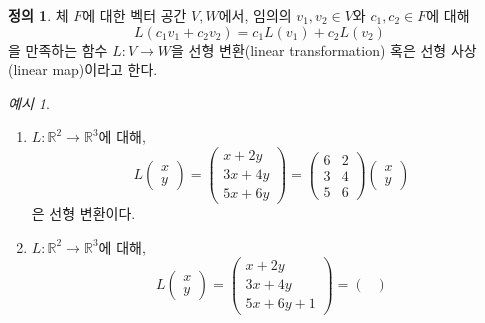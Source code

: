 \documentclass[unfonts,oneside,a4paper]{oblivoir}
\theoremstyle{definition}
\newtheorem{definition}{정의}
\theoremstyle{theorem}
\theoremstyle{remark}
\theoremstyle{remark}
\theoremstyle{remark}
\newtheorem*{example}{예시}
\theoremstyle{remark}
\renewcommand{\vec}[1]{\bm{\mathit{#1}}}
\begin{document}
\begin{definition}
    체 $F$에 대한 벡터 공간 $V, W$에서, 임의의 $\vec v_1, \vec v_2 \in V$와 $c_1, c_2 \in F$에 대해
    \begin{equation*}
        L(c_1 \vec v_1 + c_2 \vec v_2) = c_1 L(\vec v_1) + c_2 L(\vec v_2)
    \end{equation*}
    을 만족하는 함수 $L: V \rightarrow W$을 선형 변환(linear transformation) 혹은 선형 사상(linear map)이라고 한다.
\end{definition}

\begin{example}
    \leavevmode
    \begin{enumerate}
        \item $L: \mathbb R^2 \rightarrow \mathbb R^3$에 대해,
            \begin{equation*}
                L \begin{pmatrix}
                    x \\ y
                    \end{pmatrix} = \begin{pmatrix}
                    x + 2y \\ 3x + 4y \\ 5x + 6y
                    \end{pmatrix} = \begin{pmatrix}
                    6 & 2 \\ 3 & 4 \\ 5 & 6
                    \end{pmatrix} \begin{pmatrix}
                    x \\ y
                \end{pmatrix}
            \end{equation*}
            은 선형 변환이다.
        \item $L: \mathbb R^2 \rightarrow \mathbb R^3$에 대해,
            \begin{equation*}
                L \begin{pmatrix}
                    x \\ y
                    \end{pmatrix} = \begin{pmatrix}
                    x + 2y \\ 3x + 4y \\ 5x + 6y + 1
                    \end{pmatrix} = \begin{pmatrix}

\end{pmatrix}
\end{equation*}
\end{enumerate}
\end{example}
\end{document}
